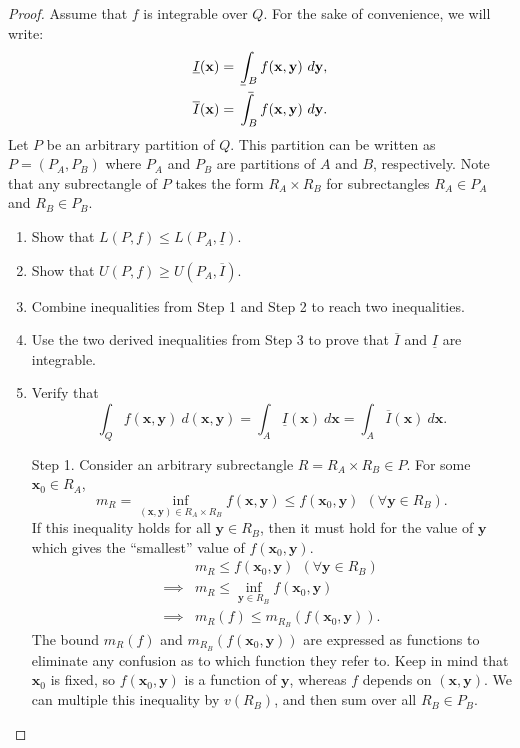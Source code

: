 \documentclass{article}
\def\upint{\mathchoice%
	{\mkern13mu\overline{\vphantom{\intop}\mkern7mu}\mkern-20mu}%
	{\mkern7mu\overline{\vphantom{\intop}\mkern7mu}\mkern-14mu}%
	{\mkern7mu\overline{\vphantom{\intop}\mkern7mu}\mkern-14mu}%
	{\mkern7mu\overline{\vphantom{\intop}\mkern7mu}\mkern-14mu}%
	\int}
\def\lowint{\mkern3mu\underline{\vphantom{\intop}\mkern7mu}\mkern-10mu\int}
\newcommand{\x}{\mathbf{x}}
\newcommand{\y}{\mathbf{y}}
\theoremstyle{definition}
\begin{document}
 \begin{proof}
 	Assume that $ f $ is integrable over $ Q $. For the sake of convenience, we will write:
 	\begin{align*}
 		\underline I(\x) &= \lowint_Bf(\x,\y)\ d\y,\\
 		\overline I(\x) &= \upint_Bf(\x,\y)\ d\y.
 	\end{align*}
 	Let $ P $ be an arbitrary partition of $ Q $. This partition can be written as $ P=(P_A, P_B) $ where $ P_A $ and $ P_B $ are partitions of $ A $ and $ B $, respectively. Note that any subrectangle of $ P $ takes the form $ R_A\times R_B $ for subrectangles $ R_A\in P_A $ and $ R_B\in P_B $.
 	\begin{enumerate}
 		\item Show that $ L(P,f)\le L(P_A, \underline{I}) $.
 		\item Show that $ U(P,f)\ge U(P_A, \overline{I}) $.
 		\item Combine inequalities from Step 1 and Step 2 to reach two inequalities.
 		\item Use the two derived inequalities from Step 3 to prove that $ \overline I $ and $ \underline I $ are integrable.
 		\item Verify that 
 		$$\int_Q f(\x,\y)\ d(\x,\y) = \int_{A}\underline{I}(\x)\ d\x = \int_{A}\overline{I}(\x)\ d\x .$$
 	\end{enumerate}
 	\begin{enumerate}
 		\item [Step 1.] Consider an arbitrary subrectangle $ R=R_A\times R_B\in P $.  For some $ \x_0\in R_A $, 
 		$$ m_{R} = \inf_{(\x,\y)\in R_A\times R_B} f(\x,\y) \le  f(\x_0,\y) \ \ (\forall \y \in R_B).$$
 		If this inequality holds for all $ \y\in R_B $, then it must hold for the value of $ \y $ which gives the ``smallest'' value of $ f(\x_0,\y) $.
 		\begin{align*}
 			 &m_{R} \le   f(\x_0,\y) \ \ (\forall \y \in R_B) \\ 
 			 \implies & m_{R} \le \inf_{\y\in R_B} f(\x_0, \y)\\
 			 \implies &  m_{R}(f) \le m_{R_B}( f(\x_0, \y)).
 		\end{align*}
 		The bound $ m_R(f) $ and $ m_{R_B}( f(\x_0, \y)) $ are expressed as functions to eliminate any confusion as to which function they refer to. Keep in mind that $ \x_0 $ is fixed, so $ f(\x_0,\y) $ is a function of $ \y $, whereas $ f $ depends on $ (\x,\y) $. We can multiple this inequality by $ v(R_B) $, and then sum over all $ R_B\in P_B $. 

\end{enumerate}
\end{proof}
\end{document}
